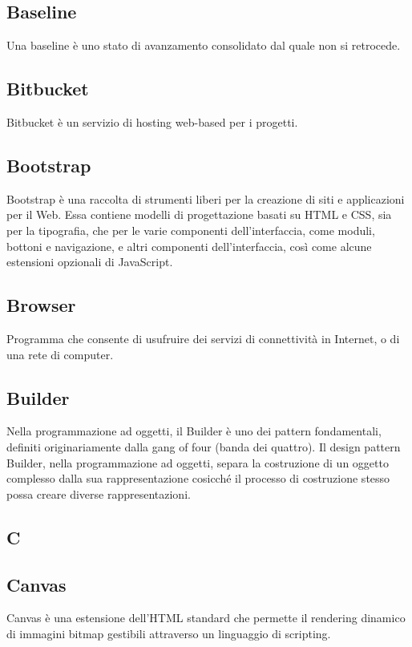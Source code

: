 \subsection*{Baseline}
Una baseline è uno stato di avanzamento consolidato dal quale non si retrocede. 

\subsection*{Bitbucket}
Bitbucket è un servizio di hosting web-based per i progetti.

\subsection*{Bootstrap}
Bootstrap è una raccolta di strumenti liberi per la creazione di siti e applicazioni per il Web. Essa contiene modelli di progettazione basati su HTML e CSS, sia per la tipografia, che per le varie componenti dell'interfaccia, come moduli, bottoni e navigazione, e altri componenti dell'interfaccia, così come alcune estensioni opzionali di JavaScript.

\subsection*{Browser}
Programma che consente di usufruire dei servizi di connettività in Internet, o di una rete di computer.

\subsection*{Builder}
Nella programmazione ad oggetti, il Builder è uno dei pattern fondamentali, definiti originariamente dalla gang of four (banda dei quattro). Il design pattern Builder, nella programmazione ad oggetti, separa la costruzione di un oggetto complesso dalla sua rappresentazione cosicché il processo di costruzione stesso possa creare diverse rappresentazioni.

\newpage

\begin{center}
\Huge\section*{\uppercase{C}}
\end{center}

\subsection*{Canvas}
Canvas è una estensione dell'HTML standard che permette il rendering dinamico di immagini bitmap gestibili attraverso un linguaggio di scripting.

